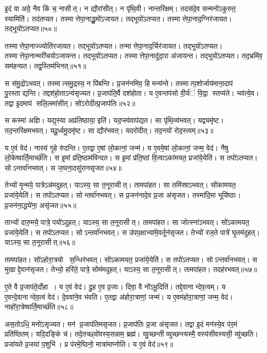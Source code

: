 इ॒दं वा अग्रे॒ नैव किं च॒ नासीत्।
न द्यौरा॑सीत्।
न पृ॑थि॒वी।
नान्तरि॑क्षम्।
तदस॑दे॒व सन्मनो॑ऽकुरुत॒ स्यामिति॑।
तद॑तप्यत।
तस्मात्तेपा॒नाद्धू॒मो॑ऽजायत।
तद्भूयो॑ऽतप्यत।
तस्मात्तेपा॒नाद॒ग्निर॑जायत।
तद्भूयो॑ऽतप्यत॥५०॥

तस्मात्तेपा॒नाज्ज्योति॑रजायत।
तद्भूयो॑ऽतप्यत।
तन्मात्तेपा॒ना\-द॒र्चिर॑जायत।
तद्भूयो॑ऽतप्यत।
तस्मात्तेपा॒नान्मरी॑चयो\-ऽजायन्त।
तद्भूयो॑ऽतप्यत।
तस्मात्तेपा॒नादु॑दा॒रा अ॑जायन्त।
तद्भूयो॑ऽतप्यत।
तद॒भ्रमि॑व॒ सम॑हन्यत।
तद्व॒स्तिम॑भिनत्॥५१॥

स स॑मु॒द्रो॑ऽभवत्।
तस्मात्समु॒द्रस्य॒ न पि॑बन्ति।
प्र॒जन॑नमिव॒ हि मन्य॑न्ते।
तस्मात्प॒शोर्जाय॑माना॒दाप॑ पु॒रस्ताद्यन्ति।
तद्दश॑हो॒ताऽन्व॑सृज्यत।
प्र॒जाप॑ति॒र्वै दश॑होता।
य ए॒वन्तप॑सो वी॒र्य॑ं वि॒द्वा स्तप्य॑ते।
भव॑त्ये॒व।
तद्वा इ॒दमाप॑ सलि॒लमा॑सीत्।
सो॑ऽरोदीत्प्र॒जाप॑तिः॥५२॥

स कस्मा॑ अज्ञि।
यद्य॒स्या अप्र॑तिष्ठाया॒ इति॑।
यद॒प्स्व॑वाप॑द्यत।
सा पृ॑थि॒व्य॑भवत्।
यद्व्यमृ॑ष्ट।
तद॒न्तरि॑क्षमभवत्।
यदू॒र्ध्वमु॒दमृ॑ष्ट।
सा द्यौर॑भवत्।
यदरो॑दीत्।
तद॒नयो॑ रोद॒स्त्वम्॥५३॥

य ए॒वं वेद॑।
नास्य॑ गृ॒हे रु॑दन्ति।
ए॒तद्वा ए॒षां लो॒कानां॒ जन्म॑।
य ए॒वमे॒षां लो॒कानां॒ जन्म॒ वेद॑।
नैषु लो॒केष्वार्ति॒मार्च्छ॑ति।
स इ॒मां प्र॑ति॒ष्ठाम॑विन्दत।
स इ॒मां प्र॑ति॒ष्ठां वि॒त्वाऽका॑मयत॒ प्रजा॑ये॒येति॑।
स तपो॑ऽतप्यत।
सोऽन्तर्वा॑नभवत्।
स ज॒घना॒दसु॑रानसृजत॥५४॥

तेभ्यो॑ मृ॒न्मये॒ पात्रेऽन्न॑मदुहत्।
याऽस्य॒ सा त॒नूरासीत्।
तामपा॑हत।
सा तमि॑स्राऽभवत्।
सो॑कामयत॒ प्रजा॑ये॒येति॑।
स तपो॑ऽतप्यत।
सोन्तर्वा॑नभवत्।
स प्र॒जन॑नादे॒व प्र॒जा अ॑सृजत।
तस्मा॑दि॒मा भूयि॑ष्ठाः।
प्र॒जन॑ना॒द्ध्ये॑ना॒ असृ॑जत॥५५॥

ताभ्यो॑ दारु॒मये॒ पात्रे॒ पयो॑ऽदुहत्।
याऽस्य॒ सा त॒नूरासीत्।
तामपा॑हत।
सा जोत्स्ना॑ऽभवत्।
सो॑ऽकामयत॒ प्रजा॑ये॒येति॑।
स तपो॑ऽतप्यत।
सोऽन्तर्वा॑नभवत्।
स उ॑पप॒क्षाभ्या॑मे॒वर्तून॑सृजत।
तेभ्यो॑ रज॒ते पात्रे॑ घृ॒तम॑दुहत्।
याऽस्य॒ सा त॒नूरासीत्॥५६॥

तामपा॑हत।
सो॑ऽहोरा॒त्रयो स॒न्धिर॑भवत्।
सो॑ऽकामयत॒ प्रजा॑ये॒येति॑।
स तपो॑ऽतप्यत।
सोऽन्तर्वा॑नभवत्।
स मुखाद्दे॒वान॑सृजत।
तेभ्यो॒ हरि॑ते॒ पात्रे॒ सोम॑मदुहत्।
याऽस्य॒ सा त॒नूरासीत्।
तामपा॑हत।
तदह॑रभवत्॥५७॥

ए॒ते वै प्र॒जाप॑ते॒र्दोहा।
य ए॒वं वेद॑।
दु॒ह ए॒व प्र॒जाः।
दिवा॒ वै नो॑ऽभू॒दिति॑।
तद्दे॒वानान्देव॒त्वम्।
य ए॒वन्दे॒वानान्देव॒त्वं वेद॑।
दे॒ववा॑ने॒व भ॑वति।
ए॒तद्वा अ॑होरा॒त्राणां॒ जन्म॑।
य ए॒वम॑होरा॒त्राणां॒ जन्म॒ वेद॑।
नाहो॑रा॒त्रेष्वार्ति॒मार्च्छ॑ति॥५८॥

अस॒तोऽधि॒ मनो॑ऽसृज्यत।
मन॑ प्र॒जाप॑तिमसृजत।
प्र॒जाप॑तिः प्र॒जा अ॑सृजत।
तद्वा इ॒दं मन॑स्ये॒व प॑र॒मं प्रति॑ष्ठितम्।
यदि॒दङ्किं च॑।
तदे॒तच्छ्वो॑वस्य॒सन्नाम॒ ब्रह्म॑।
व्यु॒च्छन्तीव्युच्छन्त्यस्मै॒ वस्य॑सीवस्यसी॒ व्यु॑च्छति।
प्रजा॑यते प्र॒जया॑ प॒शुभि॑।
प्र प॑रमे॒ष्ठिनो॒ मात्रा॑माप्नोति।
य ए॒वं वेद॑॥५९॥

